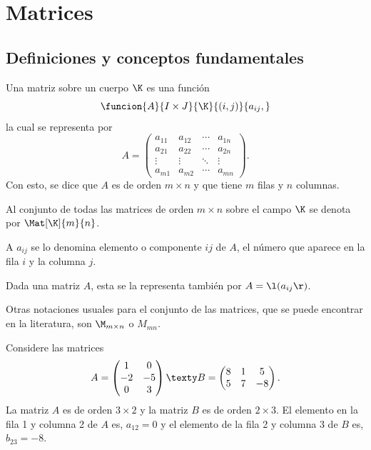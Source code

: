 \documentclass[compacto,10pt]{pubciencias-notas}
\begin{document}
\encabezado


\vspace{-8mm}

\section{Matrices}
\subsection{Definiciones y conceptos fundamentales}

\begin{defi}[Matriz]
    Una matriz sobre un cuerpo $\K$ es una función 
    \[
        \funcion{A}{I\times J}{\K}
        {(i,j)}{a_{ij},}
    \]
    la cual se representa por
    \[
        A = 
        \begin{pmatrix}
        a_{11} & a_{12} & \cdots & a_{1n} \\ 
        a_{21} & a_{22} & \cdots & a_{2n} \\ 
        \vdots & \vdots & \ddots & \vdots\\ 
        a_{m1} & a_{m2} & \cdots & a_{mn}
        \end{pmatrix}.
    \]
    Con esto, se dice que $A$ es de orden $m \times n$ y que tiene $m$ filas y $n$ columnas. 
    
    Al conjunto de todas las matrices de orden $m \times n$ sobre el campo $\K$ se denota por $\Mat[\K]{m}{n}$.
\end{defi}

\begin{obs} 
A $a_{ij}$ se lo denomina elemento o componente $ij$ de $A$, el número que aparece en la fila $i$ y la columna $j$.
\end{obs}

\begin{advertencia}
    Dada una matriz $A$, esta se la representa también por $A=\l(a_{ij}\r)$.
\end{advertencia}

\begin{advertencia}
    Otras notaciones usuales para el conjunto de las matrices, que se puede encontrar en la literatura, son $\M_{m\times n}$ o $M_{mn}$.
\end{advertencia}

\begin{ejem}\hspace{0pt} Considere las matrices
\[
    A = \begin{pmatrix}1&0\\-2&-5\\0&3\end{pmatrix}
    \texty
    B = \begin{pmatrix}8&1&5\\5&7&-8\end{pmatrix}.
\]
La matriz $A$ es de orden $3 \times 2$ y la matriz $B$ es de orden $2 \times 3$. El elemento en la fila 1 y columna 2 de $A$ es, $a_{12} = 0$ y el elemento de la fila 2 y columna 3 de $B$ es, $b_{23} = -8$.
\end{ejem}
\end{document}
